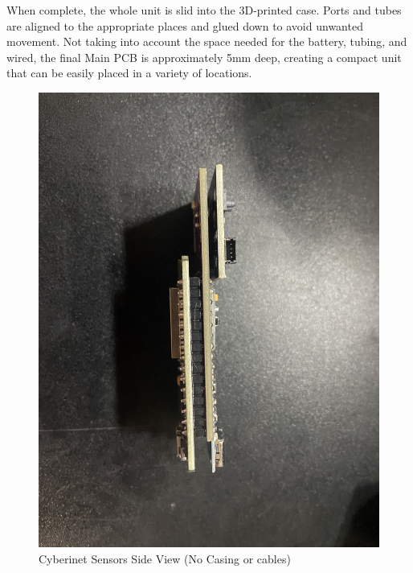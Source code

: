 When complete, the whole unit is slid into the 3D-printed case. Ports and tubes are aligned to the appropriate places and glued down to avoid unwanted movement. Not taking into account the space needed for the battery, tubing, and wired, the final Main PCB is approximately 5mm deep, creating a compact unit that can be easily placed in a variety of locations.

\begin{center}
    \begin{figure}
        \centering
        \includegraphics[scale=0.05]{diagrams/PCBs/cyberinetThin.JPG}
        \caption{Cyberinet Sensors Side View (No Casing or cables)}
        \label{fig:Cyberinetside}
    \end{figure}
\end{center}

